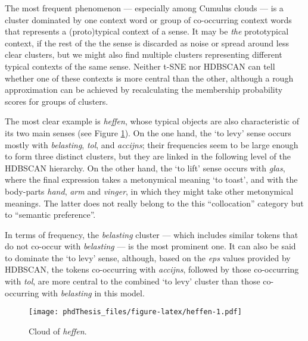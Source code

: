 \documentclass[
]{book}
\begin{document}
The most frequent phenomenon --- especially among Cumulus clouds --- is a cluster dominated by one context word or group of co-occurring context words that represents a (proto)typical context of a sense. It may be \emph{the} prototypical context, if the rest of the the sense is discarded as noise or spread around less clear clusters, but we might also find multiple clusters representing different typical contexts of the same sense. Neither t-SNE nor HDBSCAN can tell whether one of these contexts is more central than the other, although a rough approximation can be achieved by recalculating the membership probability scores for groups of clusters.

The most clear example is \emph{heffen}, whose typical objects are also characteristic of its two main senses (see Figure \ref{fig:heffen}). On the one hand, the `to levy' sense occurs mostly with \emph{belasting}, \emph{tol}, and \emph{accijns}; their frequencies seem to be large enough to form three distinct clusters, but they are linked in the following level of the HDBSCAN hierarchy. On the other hand, the `to lift' sense occurs with \emph{glas}, where the final expression takes a metonymical meaning `to toast', and with the body-parts \emph{hand}, \emph{arm} and \emph{vinger}, in which they might take other metonymical meanings. The latter does not really belong to the this ``collocation'' category but to ``semantic preference''.

In terms of frequency, the \emph{belasting} cluster --- which includes similar tokens that do not co-occur with \emph{belasting} --- is the most prominent one. It can also be said to dominate the `to levy' sense, although, based on the \emph{eps} values provided by HDBSCAN, the tokens co-occurring with \emph{accijns}, followed by those co-occurring with \emph{tol}, are more central to the combined `to levy' cluster than those co-occurring with \emph{belasting} in this model.



\begin{figure}
\centering
\texttt{[image: phdThesis\_files/figure-latex/heffen-1.pdf]}
\caption{\label{fig:heffen}Cloud of \emph{heffen}.}
\end{figure}
\end{document}
